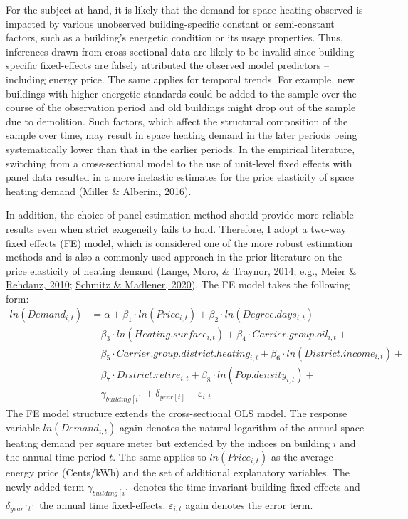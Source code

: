 \documentclass[12pt,twoside]{reedthesis}
\begin{document}
For the subject at hand, it is likely that the demand for space heating observed is impacted by various unobserved building-specific constant or semi-constant factors, such as a building's energetic condition or its usage properties. Thus, inferences drawn from cross-sectional data are likely to be invalid since building-specific fixed-effects are falsely attributed the observed model predictors -- including energy price. The same applies for temporal trends. For example, new buildings with higher energetic standards could be added to the sample over the course of the observation period and old buildings might drop out of the sample due to demolition. Such factors, which affect the structural composition of the sample over time, may result in space heating demand in the later periods being systematically lower than that in the earlier periods. In the empirical literature, switching from a cross-sectional model to the use of unit-level fixed effects with panel data resulted in a more inelastic estimates for the price elasticity of space heating demand (\protect\hyperlink{ref-miller_alberini16}{Miller \& Alberini, 2016}).

In addition, the choice of panel estimation method should provide more reliable results even when strict exogeneity fails to hold. Therefore, I adopt a two-way fixed effects (FE) model, which is considered one of the more robust estimation methods and is also a commonly used approach in the prior literature on the price elasticity of heating demand (\protect\hyperlink{ref-lange_etal14}{Lange, Moro, \& Traynor, 2014}; e.g., \protect\hyperlink{ref-meier_rehdanz10}{Meier \& Rehdanz, 2010}; \protect\hyperlink{ref-schmitz_madlener20}{Schmitz \& Madlener, 2020}). The FE model takes the following form:
\begin{align*}
ln(Demand_{i,t}) & = \alpha + \beta_1 \cdot ln(Price_{i,t}) + \beta_2 \cdot ln(Degree.days_{i,t}) + \\
 & \quad \beta_3 \cdot ln(Heating.surface_{i,t}) + \beta_{4} \cdot Carrier.group.oil_{i,t} + \\
 & \quad \beta_{5} \cdot Carrier.group.district.heating_{i,t} + \beta_{6} \cdot ln(District.income_{i,t}) + \\
 & \quad \beta_{7} \cdot District.retire_{i,t} + \beta_{8} \cdot ln(Pop.density_{i,t}) + \\
 & \quad \gamma_{building[i]} + \delta_{year[t]} + \varepsilon_{i,t}
\end{align*}
The FE model structure extends the cross-sectional OLS model. The response variable \(ln(Demand_{i,t})\) again denotes the natural logarithm of the annual space heating demand per square meter but extended by the indices on building \(i\) and the annual time period \(t\). The same applies to \(ln(Price_{i,t})\) as the average energy price (Cents/kWh) and the set of additional explanatory variables. The newly added term \(\gamma_{building[i]}\) denotes the time-invariant building fixed-effects and \(\delta_{year[t]}\) the annual time fixed-effects. \(\varepsilon_{i,t}\) again denotes the error term.
\end{document}
